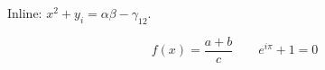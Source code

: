 \documentclass{article}
\begin{document}
\noindent Inline: $x^2 + y_i = \alpha\beta - \gamma_{12}$.

\[ f(x)=\frac{a+b}{c} \qquad e^{i\pi}+1=0 \]
\end{document}
